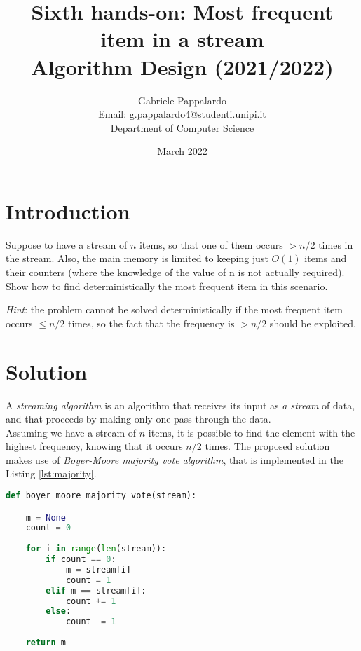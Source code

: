 \documentclass{article}
\title{Sixth hands-on: Most frequent item in a stream \\[1ex] \large Algorithm Design (2021/2022)}
\author{Gabriele Pappalardo\\Email: g.pappalardo4@studenti.unipi.it\\Department of Computer Science}
\date{March 2022}
\begin{document}
\maketitle

\section{Introduction}

Suppose to have a stream of $n$ items, so that one of them occurs $ > n/2 $ times in the stream. 
Also, the main memory is limited to keeping just $O(1)$ items and their counters (where the knowledge of the value of n is not actually required). Show how to find deterministically the most frequent item in this scenario.
\newline

\noindent \textit{Hint}: the problem cannot be solved deterministically if the most frequent item occurs $\le n/2$ times, so the fact that the frequency is $> n/2$ should be exploited.

\section{Solution}
A \textit{streaming algorithm} is an algorithm that receives its input as \textit{a stream} of data, 
and that proceeds by making only one pass through the data.\\

\noindent Assuming we have a stream of $n$ items, it is possible to find the element with the highest frequency, knowing that it occurs $n/2$ times. The proposed solution makes use of \textit{Boyer-Moore majority vote algorithm}, that is implemented in the Listing \ref{lst:majority}.

\begin{lstlisting}[language=Python,caption="Boyer-Moore majority vote algorithm",label={lst:majority}]
def boyer_moore_majority_vote(stream):

	m = None
	count = 0
	
	for i in range(len(stream)):
		if count == 0:
			m = stream[i]
			count = 1
		elif m == stream[i]:
			count += 1
		else:
			count -= 1
	
	return m
\end{lstlisting}
\end{document}
